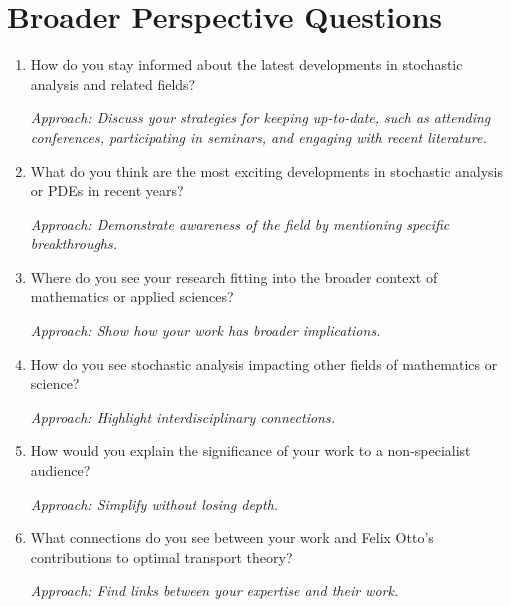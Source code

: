 \documentclass[12pt]{article}
\numberwithin{equation}{section}
\begin{document}
\section{Broader Perspective Questions}
\begin{enumerate}
    \item How do you stay informed about the latest developments in stochastic analysis and related fields?
    
    \textit{Approach: Discuss your strategies for keeping up-to-date, such as attending conferences, participating in seminars, and engaging with recent literature.}

    \item What do you think are the most exciting developments in stochastic analysis or PDEs in recent years?
    
    \textit{Approach: Demonstrate awareness of the field by mentioning specific breakthroughs.}

    \item Where do you see your research fitting into the broader context of mathematics or applied sciences?
    
    \textit{Approach: Show how your work has broader implications.}

    \item How do you see stochastic analysis impacting other fields of mathematics or science?
    
    \textit{Approach: Highlight interdisciplinary connections.}

    \item How would you explain the significance of your work to a non-specialist audience?
    
    \textit{Approach: Simplify without losing depth.}

    \item What connections do you see between your work and Felix Otto’s contributions to optimal transport theory?
    
    \textit{Approach: Find links between your expertise and their work.}
\end{enumerate}
\end{document}
